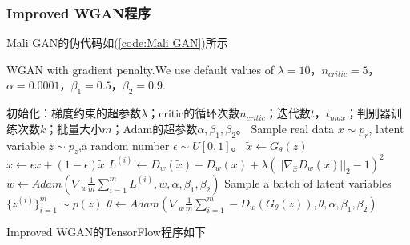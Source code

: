         \subsubsection{Improved WGAN程序}
            \par
            Mali GAN的伪代码如(\ref{code:Mali GAN})所示
            \begin{algorithm}[htbp]
                \caption{WGAN with gradient penalty.We use default values of $\lambda = 10$，$n_{critic} = 5$，$\alpha = 0.0001$，$\beta_1=0.5$，$\beta_2 = 0.9$.}
                \begin{algorithmic}[1]
                    \State 初始化：梯度约束的超参数$\lambda$；critic的循环次数$n_{critic}$；迭代数$t$，$t_{max}$；判别器训练次数$k$；批量大小$m$；Adam的超参数$\alpha,\beta_1,\beta_2$。
                                \State Sample real data $x\sim p_r$, latent variable $z\sim p_z$,a random number $\epsilon \sim U[0,1]$。
                                \State $\tilde{x} \leftarrow G_\theta(z)$
                                \State $\hat{x} \leftarrow \epsilon x+(1-\epsilon)\tilde{x}$
                                \State $L^{(i)} \leftarrow D_w(\tilde{x}) - D_w(x) +\lambda(||\nabla_{\hat{x}}D_w(\hat{x})||_2 - 1)^2 $
                            \EndFor
                            \State $w \leftarrow Adam(\nabla_w\frac{1}{m}\sum_{i=1}^m L^{(i)},w,\alpha,\beta_1,\beta_2)$
                        \EndFor
                        \State Sample a batch of latent variables $\{z^{(i)}\}_{i=1}^m \sim p(z)$
                        \State $\theta \leftarrow Adam(\nabla_w\frac{1}{m}\sum_{i=1}^m -D_w(G_\theta(z)),\theta,\alpha,\beta_1,\beta_2)$
                    \EndFor
                \end{algorithmic}
            \end{algorithm}
            \par
            Improved WGAN的TensorFlow程序如下
